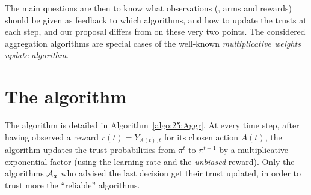 The main questions are then to know what observations (\ie, arms and rewards) should be given as feedback to which algorithms,
and how to update the trusts at each step, and our proposal \Aggr{} differs from \ExpQ{} on these very two points.
%
The considered aggregation algorithms are special cases of the well-known \emph{multiplicative weights update algorithm}.



\section{The \Aggr{} algorithm}\label{sub:25:Aggr}


The \Aggr{} algorithm is detailed in Algorithm~\ref{algo:25:Aggr}.
%
At every time step, after having observed a reward $r(t)=Y_{A(t),t}$ for its chosen action $A(t)$,
the algorithm updates the trust probabilities from $\pi^t$ to $\pi^{t+1}$ by
a multiplicative exponential factor (using the learning rate and the \emph{unbiased} reward).
%
Only the algorithms $\mathcal{A}_a$ who advised the last decision get their trust updated, in order to trust more the ``reliable'' algorithms.

